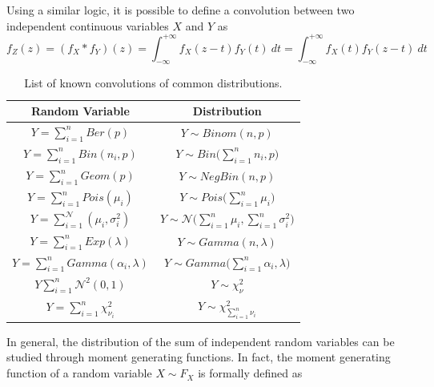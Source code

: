\documentclass{report}
\begin{document}
\noindent Using a similar logic, it is possible to define a convolution between two independent continuous variables $\displaystyle X$ and $\displaystyle Y$ as
\[f_Z(z) = (f_X * f_Y)(z) = \int_{-\infty}^{+\infty} f_X(z - t)f_Y(t) \ dt = \int_{-\infty}^{+\infty} f_X(t)f_Y(z - t) \ dt\]
\begin{table}[H]
    \centering
    \begin{tabular}{|c|c|}
        \hline
        \textbf{Random Variable} & \textbf{Distribution} \\
        \hline
        $\displaystyle Y = \sum_{i = 1}^n Ber(p)$ & $\displaystyle Y \sim Binom(n, p)$ \\
        \hline
        $\displaystyle Y = \sum_{i = 1}^n Bin(n_i, p)$ & $\displaystyle Y \sim Bin\Bigg(\sum_{i = 1}^n n_i, p\Bigg)$ \\
        \hline
        $\displaystyle Y = \sum_{i = 1}^n Geom(p)$ & $\displaystyle Y \sim NegBin(n, p)$ \\
        \hline
        $\displaystyle Y = \sum_{i = 1}^n Pois(\mu_i)$ & $\displaystyle Y \sim Pois\Bigg(\sum_{i = 1}^n \mu_i\Bigg)$ \\
        \hline
        $\displaystyle Y = \sum_{i = 1}^ \mathcal{N}(\mu_i, \sigma_i^2)$ & $\displaystyle Y \sim \mathcal{N}\Bigg(\sum_{i = 1}^n \mu_i, \sum_{i = 1}^n \sigma_i^2\Bigg)$ \\
        \hline
        $\displaystyle Y = \sum_{i = 1}^n Exp(\lambda)$ & $\displaystyle Y \sim Gamma(n, \lambda)$ \\
        \hline
        $\displaystyle Y = \sum_{i = 1}^n Gamma(\alpha_i, \lambda)$ & $\displaystyle Y \sim Gamma\Bigg(\sum_{i = 1}^n \alpha_i, \lambda\Bigg)$ \\
        \hline
        $\displaystyle  Y\sum_{i = 1}^n \mathcal{N}^2(0, 1)$ & $\displaystyle Y \sim \chi_{\nu}^2$ \\
        \hline
        $\displaystyle Y = \sum_{i = 1}^n \chi_{\nu_i}^2$ & $\displaystyle Y \sim \chi_{\sum_{i = 1}^n \nu_i}^2$ \\
        \hline
    \end{tabular}
    \caption{List of known convolutions of common distributions.}
    \label{tab:convolution_list}
\end{table}
\noindent In general, the distribution of the sum of independent random variables can be studied through moment generating functions. \newline
In fact, the moment generating function of a random variable $\displaystyle X \sim F_X$ is formally defined as
\end{document}
